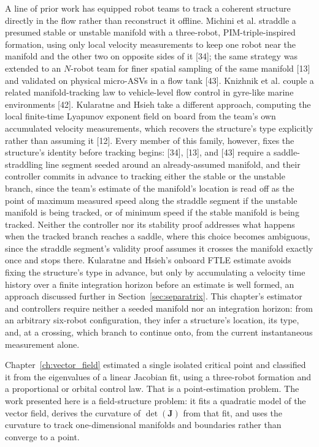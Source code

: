 \documentclass[12pt, letterpaper, oneside]{report}
\begin{document}
A line of prior work has equipped robot teams to track a coherent structure
directly in the flow rather than reconstruct it offline. Michini et al.
straddle a presumed stable or unstable manifold with a three-robot,
PIM-triple-inspired formation, using only local velocity measurements to
keep one robot near the manifold and the other two on opposite sides of it
[34]; the same strategy was extended to an $N$-robot team for finer spatial
sampling of the same manifold [13] and validated on physical micro-ASVs in a
flow tank [43]. Knizhnik et al. couple a related manifold-tracking law to
vehicle-level flow control in gyre-like marine environments [42]. Kularatne
and Hsieh take a different approach, computing the local finite-time
Lyapunov exponent field on board from the team's own accumulated velocity
measurements, which recovers the structure's type explicitly rather than
assuming it [12]. Every member of this family, however, fixes the
structure's identity before tracking begins: [34], [13], and [43] require a
saddle-straddling line segment seeded around an already-assumed manifold,
and their controller commits in advance to tracking either the stable or
the unstable branch, since the team's estimate of the manifold's location
is read off as the point of maximum measured speed along the straddle
segment if the unstable manifold is being tracked, or of minimum speed if
the stable manifold is being tracked. Neither the controller nor its
stability proof addresses what happens when the tracked branch reaches a
saddle, where this choice becomes ambiguous, since the straddle segment's
validity proof assumes it crosses the manifold exactly once and stops
there. Kularatne and Hsieh's onboard FTLE estimate avoids fixing the
structure's type in advance, but only by accumulating a velocity time
history over a finite integration horizon before an estimate is well
formed, an approach discussed further in
Section~\ref{sec:separatrix}. This chapter's estimator and controllers
require neither a seeded manifold nor an integration horizon: from an
arbitrary six-robot configuration, they infer a structure's location, its
type, and, at a crossing, which branch to continue onto, from the current
instantaneous measurement alone.

Chapter~\ref{ch:vector_field} estimated a single isolated critical point and
classified it from the eigenvalues of a linear Jacobian fit, using a
three-robot formation and a proportional or orbital control law. That is a
point-estimation problem. The work presented here is a field-structure
problem: it fits a quadratic model of the vector field, derives the
curvature of $\det(\mathbf{J})$ from that fit, and uses the curvature to
track one-dimensional manifolds and boundaries rather than converge to a
point.
\end{document}
